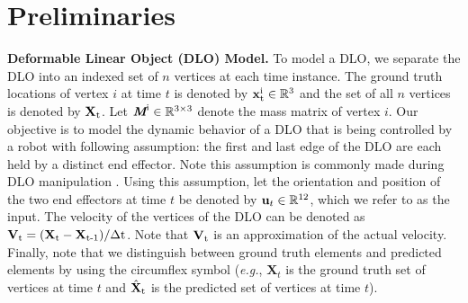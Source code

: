  \section{Preliminaries}

\textbf{Deformable Linear Object (DLO) Model.}
To model a DLO, we separate the DLO into an indexed set of $n$ vertices at each time instance. 
The ground truth locations of vertex $i$ at time $t$ is denoted by $\textbf{x}^\text{i}_\text{t} \in \mathbb{R}^3$ and the set of all $n$ vertices is denoted by $\textbf{X}_\text{t}$. 
Let $\textit{\textbf{M}}^\text{i}\in \mathbb{R}^{3\times3}$ denote the mass matrix of vertex $i$.
Our objective is to model the dynamic behavior of a DLO that is being controlled by a robot with following assumption:
the first and last edge of the DLO are each held by a distinct end effector.
Note this assumption is commonly made during DLO manipulation \cite{IRP, diminishingridgidity, directionalrigidity, inlstm, gelsim}. Using this assumption, let the orientation and position of the two end effectors at time $t$ be denoted by $\textbf{u}_t \in \mathbb{R}^{12}$, which we refer to as the input.
The velocity of the vertices of the DLO can be denoted as $\textbf{V}_\text{t}  = (\textbf{X}_\text{t} - \textbf{X}_\text{t-1})/\Delta \text{t}$. Note that $\textbf{V}_\text{t}$ is an approximation of the actual velocity.
Finally, note that we distinguish between ground truth elements and predicted elements by using the circumflex symbol (\textit{e.g.}, $\textbf{X}_{t}$ is the ground truth set of vertices at time $t$ and $\hat{\textbf{X}}_\text{t}$ is the predicted set of vertices at time $t$).


